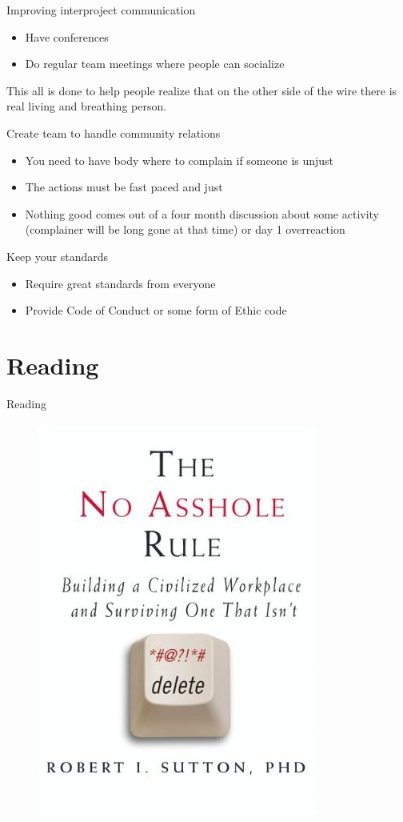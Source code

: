 \documentclass{beamer}
\begin{document}
\begin{frame}[t]{Improving interproject communication}
	\begin{itemize}
	\item Have conferences
	\item Do regular team meetings where people can socialize
	\end{itemize}
	\vspace{0.8cm}
	\begin{center}
	This all is done to help people realize that on the other side of the wire there is real living and breathing person.
	\end{center}
\end{frame}

\begin{frame}[t]{Create team to handle community relations}
	\begin{itemize}
	\item You need to have body where to complain if someone is unjust
	\item The actions must be fast paced and just
	\item Nothing good comes out of a four month discussion about some activity (complainer will be long gone at that time) or day 1 overreaction
	\end{itemize}
\end{frame}

\begin{frame}[t]{Keep your standards}
	\begin{itemize}
	\item Require great standards from everyone
	\item Provide Code of Conduct or some form of Ethic code
	\end{itemize}
\end{frame}

\section{Reading}

\begin{frame}{Reading}
	\begin{figure}
	\includegraphics[width= 0.4\linewidth]{The_No_Asshole_Rule.jpg}
	\end{figure}
\end{frame}
\end{document}
